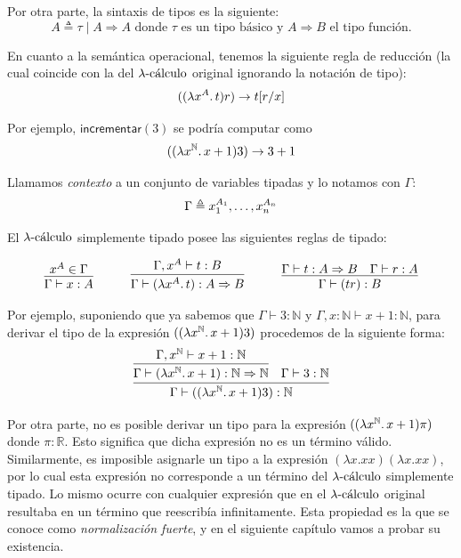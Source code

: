 Por otra parte, la sintaxis de tipos es la siguiente:
\[
  A \triangleq \tau \mid A \Rightarrow A \text{ donde } \tau \text{ es un tipo básico y } A \Rightarrow B \text{ el tipo función.}
\]

En cuanto a la semántica operacional, tenemos la siguiente regla de reducción (la cual coincide con la del \( \lambdacalculus \) original ignorando la notación de tipo):
\[
  \stlcapp{\stlcabstr{x}{A}{t}}{r} \reducesto t[r/x]
\]

Por ejemplo, \( \mathsf{incrementar}(3) \) se podría computar como
\[ \stlcapp{\stlcabstr{x}{\mathbb{N}}{x + 1}}{3} \reducesto 3 + 1 \]

Llamamos \textit{contexto} a un conjunto de variables tipadas y lo notamos con \( \Gamma \):
\[
  \Gamma \triangleq \vrbl{x_1}{A_1}, \ldots, \vrbl{x_n}{A_n}
\]

El \( \lambdacalculus \) simplemente tipado posee las siguientes reglas de tipado:

\begin{equation*}
  \infer{\Gamma \vdash x : A}{\vrbl{x}{A} \in \Gamma}
  \quad\quad\quad
  \infer{\Gamma \vdash \stlcabstr{x}{A}{t} : A \Rightarrow B}{\Gamma, \vrbl{x}{A} \vdash t : B}
  \quad\quad\quad
  \infer{\Gamma \vdash \stlcapp{t}{r} : B}{\Gamma \vdash t : A \Rightarrow B & \Gamma \vdash r : A}
\end{equation*}

Por ejemplo, suponiendo que ya sabemos que \( \Gamma \vdash 3 : \mathbb{N} \) y \( \Gamma, x : \mathbb{N} \vdash x + 1 : \mathbb{N} \), para derivar el tipo de la expresión \( \stlcapp{\stlcabstr{x}{\mathbb{N}}{x + 1}}{3} \) procedemos de la siguiente forma:
\[ \infer{\Gamma \vdash \stlcapp{\stlcabstr{x}{\mathbb{N}}{x + 1}}{3} : \mathbb{N}}{\infer{\Gamma \vdash \stlcabstr{x}{\mathbb{N}}{x + 1} : \mathbb{N} \Rightarrow \mathbb{N}}{\Gamma, \vrbl{x}{\mathbb{N}} \vdash x + 1 : \mathbb{N}} & \Gamma \vdash 3 : \mathbb{N}} \]

Por otra parte, no es posible derivar un tipo para la expresión \( \stlcapp{\stlcabstr{x}{\mathbb{N}}{x + 1}}{\pi} \) donde \( \pi : \mathbb{R} \). Esto significa que dicha expresión no es un término válido. Similarmente, es imposible asignarle un tipo a la expresión \( (\lambda x . x x)(\lambda x . x x) \), por lo cual esta expresión no corresponde a un término del \( \lambdacalculus \) simplemente tipado. Lo mismo ocurre con cualquier expresión que en el \( \lambdacalculus \) original resultaba en un término que reescribía infinitamente. Esta propiedad es la que se conoce como \textit{normalización fuerte}, y en el siguiente capítulo vamos a probar su existencia.
